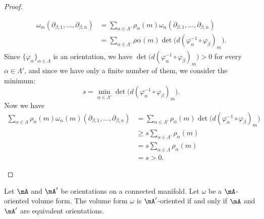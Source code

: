 \begin{proof}
\begin{subproof}
\begin{subequations}
\begin{align}
				\omega_m(\partial_{\beta,1},\ldots,\partial_{\beta,n}) & = \sum_{\alpha\in\Lambda'}\rho_{\alpha}(m) \omega_{\alpha}(\partial_{\beta,1},\ldots,\partial_{\beta,n}) \\
				                                                       & =\sum_{\alpha\in\Lambda'}\rho{\alpha}(m)\det\big( d(\varphi_{\alpha}^{-1}\circ\varphi_{\beta})_m \big).
			\end{align}
		\end{subequations}
		Since \( \{ \varphi_{\alpha} \}_{\alpha\in\Lambda}\) is an orientation, we have \( \det\big( d(\varphi_{\alpha}^{-1}\circ\varphi_{\beta})_m \big)>0\) for every \( \alpha\in \Lambda'\), and since we have only a finite number of them, we consider the minimum:
		\begin{equation}
			s=\min_{\alpha\in \Lambda'}\det\big( d(\varphi^{-1}_{\alpha}\circ\varphi_{\beta})_m \big).
		\end{equation}
		Now we have
		\begin{subequations}
			\begin{align}
				\sum_{\alpha\in\Lambda}\rho_{\alpha}(m)\omega_{\alpha}(m)(\partial_{\beta,1},\ldots,\partial_{\beta,n}) & = \sum_{\alpha\in\Lambda'}\rho_{\alpha}(m)\det\big( d(\varphi_{\alpha}^{-1}\circ\varphi_{\beta})_m \big) \\
				                                                                                                        & \geq s\sum_{\alpha\in \Lambda'}\rho_{\alpha}(m)                                                          \\
				                                                                                                        & =s\sum_{\alpha\in\Lambda}\rho_{\alpha}(m)                                                                \\
				                                                                                                        & =s >0.
			\end{align}
		\end{subequations}
	\end{subproof}
\end{proof}

\begin{lemma}	\label{LEMooHLYAooAeEnZb}
	Let \( \mA\) and \( \mA'\) be orientations on a connected manifold. Let \( \omega\) be a \( \mA\)-oriented volume form. The volume form \( \omega\) is \( \mA'\)-oriented if and only if \( \mA\) and \( \mA'\)  are equivalent orientations.
\end{lemma}

